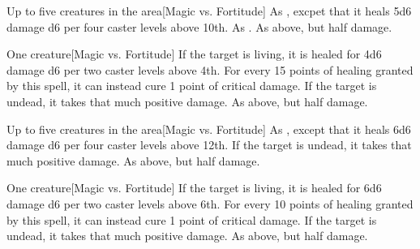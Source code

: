 \spellrng{\rngclose}
\begin{spelltargets}{Up to five creatures in the area}[Magic vs. Fortitude]
    \spelleffect As , excpet that it heals 5d6 damage \add d6 per four caster levels above 10th.
    \spellsuccess As .
    \spellfailure As above, but half damage.
\end{spelltargets}

\spellrng{\rngclose}
\begin{spelltarget}{One creature}[Magic vs. Fortitude]
    \spelleffect If the target is living, it is healed for 4d6 damage \add d6 per two caster levels above 4th. For every 15 points of healing granted by this spell, it can instead cure 1 point of critical damage.
    \spellsuccess If the target is undead, it takes that much positive damage.
    \spellfailure As above, but half damage.
\end{spelltarget}

\begin{spelltargets}{Up to five creatures in the area}[Magic vs. Fortitude]
    \spelleffect As , except that it heals 6d6 damage \add d6 per four caster levels above 12th.
    \spellsuccess If the target is undead, it takes that much positive damage.
    \spellfailure As above, but half damage.
\end{spelltargets}

\spellrng{\rngclose}
\begin{spelltarget}{One creature}[Magic vs. Fortitude]
    \spelleffect If the target is living, it is healed for 6d6 damage \add d6 per two caster levels above 6th. For every 10 points of healing granted by this spell, it can instead cure 1 point of critical damage.
    \spellsuccess If the target is undead, it takes that much positive damage.
    \spellfailure As above, but half damage.
\end{spelltarget}

